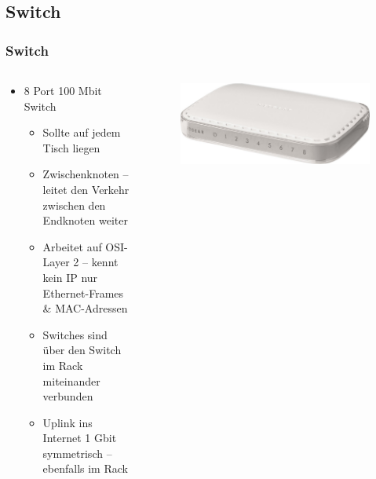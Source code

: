 \documentclass[xcolor=dvipsnames, aspectratio=169]{beamer}
\begin{document}
\subsection{Switch}
\begin{frame}
	\frametitle{Switch}
	\begin{columns}
		\begin{column}{0.5\textwidth}
   			\begin{itemize}
   				\item 8 Port 100 Mbit Switch
   				\begin{itemize}
   					\item Sollte auf jedem Tisch liegen
   					\item Zwischenknoten -- leitet den Verkehr zwischen den Endknoten weiter 
   					\item Arbeitet auf OSI-Layer 2 -- kennt kein IP nur Ethernet-Frames \& MAC-Adressen
   					\item Switches sind über den Switch im Rack miteinander verbunden
   					\item Uplink ins Internet 1 Gbit symmetrisch -- ebenfalls im Rack 
   				\end{itemize}
   			\end{itemize}
		\end{column}
	\begin{column}{0.5\textwidth}  %
	\vspace{-1cm}
	\begin{figure}
    \begin{center}
     \includegraphics[scale=0.2]{netgear_switch}
     \end{center}
     \end{figure}
\end{column}
\end{columns}
\end{frame}
\end{document}
